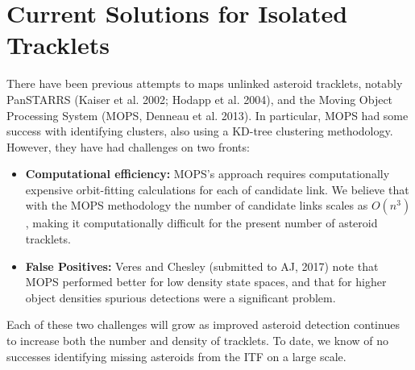 \documentclass[11pt,letter]{article}
\begin{document}
\section*{Current Solutions for Isolated Tracklets}
There have been previous attempts to maps unlinked asteroid tracklets, notably PanSTARRS
(Kaiser et al. 2002; Hodapp et al. 2004), and the Moving Object Processing System (MOPS, Denneau et al. 2013).  In particular, MOPS had some success with identifying clusters, also using a KD-tree clustering methodology.  However, they have had challenges on two fronts:
\begin{itemize}
    \item \textbf{Computational efficiency:}
    MOPS's approach requires computationally expensive orbit-fitting calculations for each of candidate link. We believe that with the MOPS methodology the number of candidate links scales as $O(n^3)$, making it computationally difficult for the present number of asteroid tracklets.
    \item \textbf{False Positives:}
    Veres and Chesley (submitted to AJ, 2017) note that MOPS performed better for low density state spaces, and that for higher object densities spurious detections were a significant problem.
\end{itemize}    
Each of these two challenges will grow as improved asteroid detection continues to increase both the number and density of tracklets.  To date, we know of no successes identifying missing asteroids from the ITF on a large scale.
    
\end{document}
